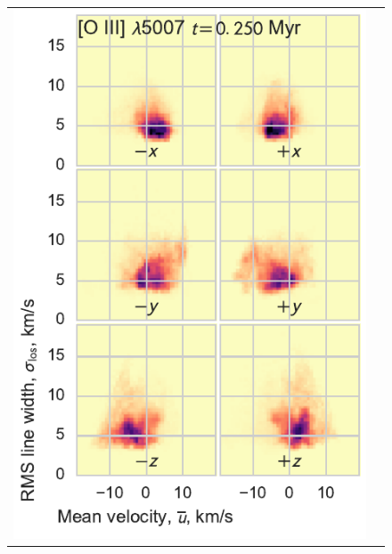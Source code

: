 \documentclass[useAMS,usenatbib]{mn2e}
\begin{document}
\begin{figure}
\begin{tabular}{@{}ll@{}}
    \includegraphics{hist-vmean-sig-0025-O35007}

\end{tabular}
\end{figure}
\end{document}
